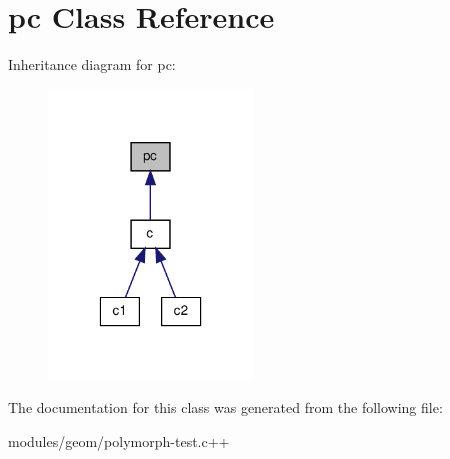 \hypertarget{classpc}{\section{pc Class Reference}
\label{classpc}
}


Inheritance diagram for pc\-:\nopagebreak
\begin{figure}[H]
\begin{center}
\leavevmode
\includegraphics[width=154pt]{classpc__inherit__graph}
\end{center}
\end{figure}


The documentation for this class was generated from the following file\-:\begin{DoxyCompactItemize}
\item 
modules/geom/polymorph-\/test.\-c++\end{DoxyCompactItemize}
